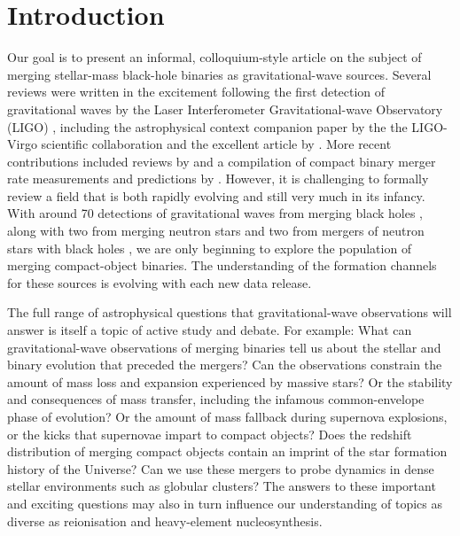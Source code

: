 \documentclass[review]{elsarticle}
\begin{document}
\section{Introduction}

Our goal is to present an informal, colloquium-style article on the subject of merging stellar-mass black-hole binaries as gravitational-wave sources. Several reviews were written in the excitement following the first detection \citep{GW150914} of gravitational waves by the Laser Interferometer Gravitational-wave Observatory (LIGO) \citep{GW150914:detectors}, including the astrophysical context companion paper by the the LIGO-Virgo scientific collaboration \citep{GW150914:astro} and the excellent article by \citet{Miller:2016}.  More recent contributions included reviews by \citet{Mapelli:2018,Mapelli:2021} and a compilation of compact binary merger rate measurements and predictions by \citet{MandelBroekgaarden:2021}. However, it is challenging to formally review a field that is both rapidly evolving and still very much in its infancy.  With around 70 detections of gravitational waves from merging black holes \citep{BBH:O1,BBH:O2,Venumadhav:2020,GWTC2,Abbott:2021-GWTC-2-1,Nitz:2021,GWTC3}, along with two from merging neutron stars \citep{GW170817, GW190425} and two from mergers of neutron stars with black holes \citep{GW200105}, we are only beginning to explore the population of merging compact-object binaries.  The understanding of the formation channels for these sources is evolving with each new data release.

The full range of astrophysical questions that gravitational-wave observations will answer is itself a topic of active study and debate. For example: What can gravitational-wave observations of merging binaries tell us about the stellar and binary evolution that preceded the mergers?  Can the observations constrain the amount of mass loss and expansion experienced by massive stars? Or the stability and consequences of mass transfer, including the infamous common-envelope phase of evolution? Or the amount of mass fallback during supernova explosions, or the kicks that supernovae impart to compact objects? Does the redshift distribution of merging compact objects contain an imprint of the star formation history of the Universe?  Can we use these mergers to probe dynamics in dense stellar environments such as globular clusters? The answers to these important and exciting questions may also in turn influence our understanding of topics as diverse as reionisation and heavy-element nucleosynthesis.
\end{document}
